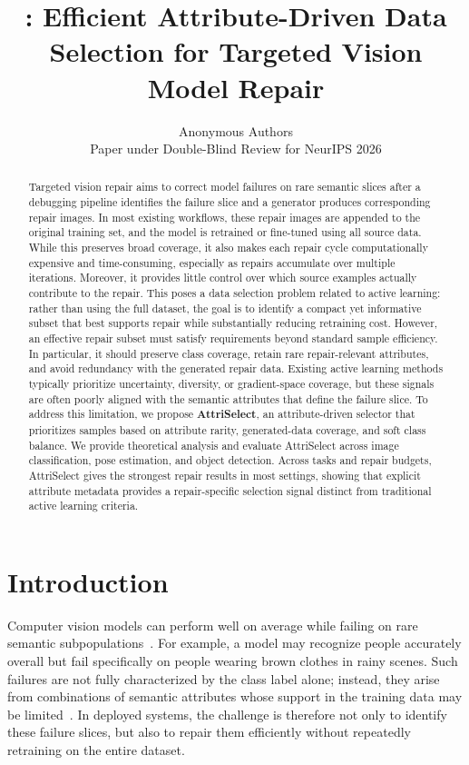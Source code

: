 \documentclass{article}
\title{\model: Efficient Attribute-Driven Data Selection for Targeted Vision Model Repair}
\author{%
  Anonymous Authors \\
  Paper under Double-Blind Review for NeurIPS 2026 %
}
\newcommand{\model}{AttriSelect\xspace}
\begin{document}
\maketitle

\begin{abstract}
Targeted vision repair aims to correct model failures on rare semantic slices after a debugging pipeline identifies the failure slice and a generator produces corresponding repair images. In most existing workflows, these repair images are appended to the original training set, and the model is retrained or fine-tuned using all source data. While this preserves broad coverage, it also makes each repair cycle computationally expensive and time-consuming, especially as repairs accumulate over multiple iterations. Moreover, it provides little control over which source examples actually contribute to the repair. This poses a data selection problem related to active learning: rather than using the full dataset, the goal is to identify a compact yet informative subset that best supports repair while substantially reducing retraining cost. However, an effective repair subset must satisfy requirements beyond standard sample efficiency. In particular, it should preserve class coverage, retain rare repair-relevant attributes, and avoid redundancy with the generated repair data. Existing active learning methods typically prioritize uncertainty, diversity, or gradient-space coverage, but these signals are often poorly aligned with the semantic attributes that define the failure slice. To address this limitation, we propose \textbf{\model}, an attribute-driven selector that prioritizes samples based on attribute rarity, generated-data coverage, and soft class balance. We provide theoretical analysis and evaluate \model across image classification, pose estimation, and object detection. Across tasks and repair budgets, \model gives the strongest repair results in most settings, showing that explicit attribute metadata provides a repair-specific selection signal distinct from traditional active learning criteria.
\end{abstract}

\section{Introduction}

Computer vision models can perform well on average while failing on rare semantic subpopulations~\citep{barbu2019objectnet,geirhos2020shortcut,chen2023hibug}. For example, a model may recognize people accurately overall but fail specifically on people wearing brown clothes in rainy scenes. Such failures are not fully characterized by the class label alone; instead, they arise from combinations of semantic attributes whose support in the training data may be limited~\citep{buolamwini2018gender,eyuboglu2022domino}. In deployed systems, the challenge is therefore not only to identify these failure slices, but also to repair them efficiently without repeatedly retraining on the entire dataset.
\end{document}

